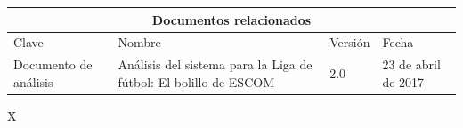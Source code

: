 \documentclass[oneside,10pt]{book}
\begin{document}
\begin{table}[]
\centering
\label{my-label}
\begin{tabularx}{\textwidth}{ X X X X }
\multicolumn{4}{c}{\cellcolor[HTML]{CBCEFB}Documentos relacionados}                                                                                         \\ \hline
\multicolumn{1}{|X|}{Clave} 		& \multicolumn{1}{X|}{Nombre}                      		& \multicolumn{1}{X|}{Versión}   	& \multicolumn{1}{X|}{Fecha}     \\ \hline
\multicolumn{1}{|X|}{Documento de análisis}   	& \multicolumn{1}{X|}{Análisis del sistema para la Liga de fútbol: El bolillo de ESCOM} 	& \multicolumn{1}{X|}{2.0} 		& \multicolumn{1}{X|}{23 de abril de 2017} \\ \hline
\end{tabularx}
\end{table}

\begin{table}[]
\centering
\label{my-label}
\begin{tabularx}{\textwidth}{ X }
                                                                                         \\ \hline
{} \\
 \\
 \\
 \\
 \\
 \\
 \\
\\ \hline
\end{tabularx}
\end{table}
\end{document}
